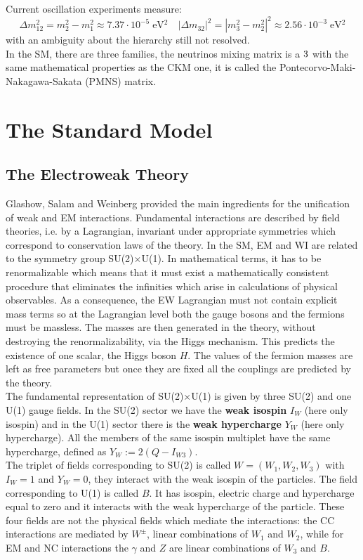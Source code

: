 \documentclass[10.75pt,a4paper,openright,bottom=2cm]{article}
\begin{document}
Current oscillation experiments measure:
\[
\Delta m_{12}^2=m_2^2-m_1^2\approx7.37\cdot10^{-5}\;\text{eV$^2$} \quad |\Delta m_{32}|^2=|m_3^2-m_2^2|^2\approx2.56\cdot10^{-3}\;\text{eV$^2$}
\]
with an ambiguity about the hierarchy still not resolved.\\
In the SM, there are three families, the neutrinos mixing matrix is a $3\time3$ with the same mathematical properties as the CKM one, it is called the Pontecorvo-Maki-Nakagawa-Sakata (PMNS) matrix. 
\section{The Standard Model}
\subsection{The Electroweak Theory}
Glashow, Salam and Weinberg provided the main ingredients for the unification of weak and EM interactions. Fundamental interactions are described by field theories, i.e. by a Lagrangian, invariant under appropriate symmetries which correspond to conservation laws of the theory. In the SM, EM and WI are related to the symmetry group SU(2)$\times$U(1). In mathematical terms, it has to be renormalizable which means that it must exist a mathematically consistent procedure that eliminates the infinities which arise in calculations of physical observables. As a consequence, the EW Lagrangian must not contain explicit mass terms so at the Lagrangian level both the gauge bosons and the fermions must be massless. The masses are then generated in the theory, without destroying the renormalizability, via the Higgs mechanism. This predicts the existence of one scalar, the Higgs boson $H$. The values of the fermion masses are left as free parameters but once they are fixed all the couplings are predicted by the theory.\\
The fundamental representation of SU(2)$\times$U(1) is given by three SU(2) and one U(1) gauge fields. In the SU(2) sector we have the \textbf{weak isospin} $I_W$ (here only isospin) and in the U(1) sector there is the \textbf{weak hypercharge} $Y_W$ (here only hypercharge). All the members of the same isospin multiplet have the same hypercharge, defined as $Y_W:=2(Q-I_{W3})$.\\
The triplet of fields corresponding to SU(2) is called $W=(W_1,W_2,W_3)$ with $I_W=1$ and $Y_W=0$, they interact with the weak isospin of the particles. The field corresponding to U(1) is called $B$. It has isospin, electric charge and hypercharge equal to zero and it interacts with the weak hypercharge of the particle. These four fields are not the physical fields which mediate the interactions: the CC interactions are mediated by $W^\pm$, linear combinations of $W_1$ and $W_2$, while for EM and NC interactions the $\gamma$ and $Z$ are linear combinations of $W_3$ and $B$.\\
\end{document}
